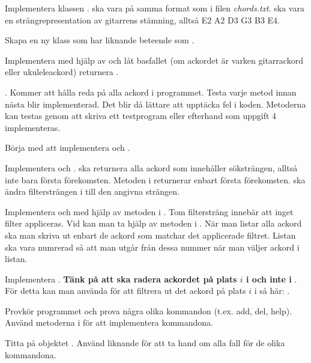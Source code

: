 {\Subtask Implementera klassen .  ska vara på samma format som i filen \textit{chords.txt}.  ska vara en strängrepresentation av gitarrens stämning, alltså E2 A2 D3 G3 B3 E4.

\Subtask Skapa en ny klass  som har liknande beteende som .

\Subtask Implementera  med hjälp av  och låt basfallet (om ackordet är varken gitarrackord eller ukuleleackord) returnera .

\Task {}. Kommer att hålla reda på alla ackord i programmet. Testa varje metod innan nästa blir implementerad. Det blir då lättare att upptäcka fel i koden. Metoderna kan testas genom att skriva ett testprogram eller efterhand som uppgift 4 implementeras.

\Subtask Börja med att implementera  och .

\Subtask Implementera  och .  ska returnera alla ackord som innehåller söksträngen, alltså inte bara första förekomsten. Metoden  i  returnerar enbart första förekomsten.  ska ändra filtersträngen i  till den angivna strängen.

\Subtask Implementera  och  med hjälp av metoden  i . Tom filtersträng innebär att inget filter appliceras. Vid  kan man ta hjälp av metoden  i . När man listar alla ackord ska man skriva ut enbart de ackord som matchar det applicerade filtret. Listan ska vara numrerad så att man utgår från dessa nummer när man väljer ackord i listan.

\Subtask Implementera . \textbf{Tänk på att  ska radera ackordet på plats $i$ i  och inte i }. För detta kan man använda  för att filtrera ut det ackord på plats $i$ i  så här: .

\Task {}

\Subtask Provkör programmet och prova några olika kommandon (t.ex. add, del, help). Använd metoderna i  för att implementera kommandona.

\Subtask Titta på objektet . Använd liknande  för att ta hand om alla fall för de olika kommandona.

}
